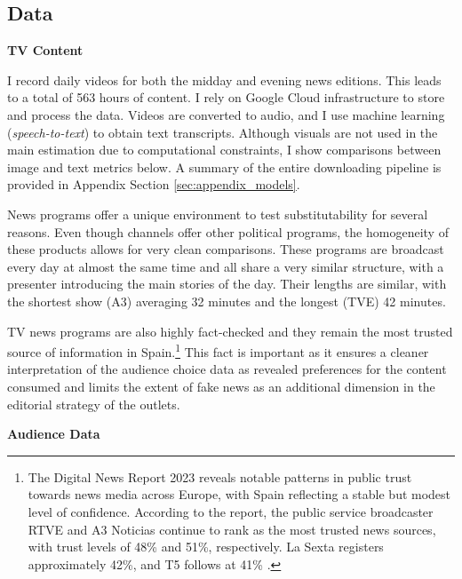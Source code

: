 \documentclass[12pt]{article}
\begin{document}
		\subsection{Data}
		
			\textbf{TV Content}
		
		I record daily  videos for both the midday and evening news editions. This leads to a total of 563 hours of content. I rely on Google Cloud infrastructure to store and process the data. Videos are converted to audio, and I use machine learning (\textit{speech-to-text}) to obtain text transcripts. Although visuals are not used in the main estimation due to computational constraints, I show comparisons between image and text metrics below. A summary of the entire downloading pipeline is provided in Appendix Section \ref{sec:appendix_models}.
		
		News programs offer a unique environment to test substitutability for several reasons. Even though channels offer other political programs, the homogeneity of these products allows for very clean comparisons. These programs are broadcast every day at almost the same time and all share a very similar structure, with a presenter introducing the main stories of the day. Their lengths are similar, with the shortest show (A3) averaging 32 minutes and the longest (TVE) 42 minutes.
		
		TV news programs are also highly fact-checked and they remain the most trusted source of information in Spain.\footnote{The Digital News Report 2023 reveals notable patterns in public trust towards news media across Europe, with Spain reflecting a stable but modest level of confidence. According to the report, the public service broadcaster RTVE and A3 Noticias continue to rank as the most trusted news sources, with trust levels of 48\% and 51\%, respectively. La Sexta registers  approximately 42\%, and T5 follows at 41\% \citep{reuters_dnr_2023}.} This fact is important as it ensures a cleaner interpretation of the audience choice data as revealed preferences for the content consumed and limits the extent of fake news as an additional dimension in the editorial strategy of the outlets. 
		
	
	\textbf{Audience Data}
	
\end{document}
